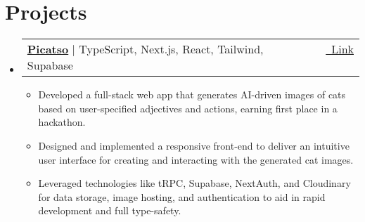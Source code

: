 \documentclass[letterpaper,11pt]{article}
\makeatletter
\newcommand{\resumeItem}[1]{
  \item\small{
    {#1 \vspace{-2pt}}
  }
}
\newcommand{\resumeProjectHeading}[2]{
    \item
    \begin{tabular*}{0.97\textwidth}{l@{\extracolsep{\fill}}r}
      \small#1 & #2 \\
    \end{tabular*}\vspace{-7pt}
}
\newcommand{\resumeSubHeadingListStart}{\begin{itemize}[leftmargin=0.15in, label={}]}
\newcommand{\resumeSubHeadingListEnd}{\end{itemize}}
\newcommand{\resumeItemListStart}{\begin{itemize}}
\newcommand{\resumeItemListEnd}{\end{itemize}\vspace{-5pt}}
\makeatother
\begin{document}
\section{Projects}
    \resumeSubHeadingListStart
        \resumeProjectHeading
          {\textbf{\href{https://picatso.vercel.app/}{Picatso}} $|$ {TypeScript, Next.js, React, Tailwind, Supabase}}{\vspace{3pt} \href{https://picatso.vercel.app/}{\raisebox{-0.2\height}\ \underline{Link}} ~}
          \resumeItemListStart
            \resumeItem{Developed a full-stack web app that generates AI-driven images of cats based on user-specified adjectives and actions, earning first place in a hackathon.}
            \vspace{2pt}
            \resumeItem{Designed and implemented a responsive front-end to deliver an intuitive user interface for creating and interacting with the generated cat images. }
            \vspace{2pt}
            \resumeItem{Leveraged technologies like tRPC, Supabase, NextAuth, and Cloudinary for data storage, image hosting, and authentication to aid in rapid development and full type-safety.}
          \resumeItemListEnd
    \resumeSubHeadingListEnd

\vspace{-2pt}

\end{document}
